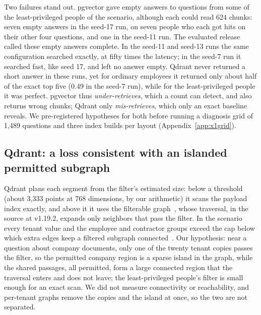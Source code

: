 Two failures stand out. pgvector gave empty answers to questions from some of the least-privileged people of the scenario, although
each could read 624 chunks: seven empty answers in the seed-17 run, on seven people who each got hits on their other four questions, and one in the
seed-11 run. The evaluated release called these empty
answers complete. In the seed-11 and seed-13 runs the same configuration searched exactly, at fifty times the latency; in the seed-7 run it
searched fast, like seed 17, and left no answer empty. Qdrant never
returned a short answer in these runs, yet for ordinary employees it returned only about half of the exact top five (0.49 in the seed-7
run), while for the least-privileged people it was perfect. pgvector thus \emph{under-retrieves}, which a count can detect,
and also returns wrong chunks; Qdrant only \emph{mis-retrieves}, which only an exact baseline reveals. We pre-registered
hypotheses for both before running a diagnosis grid of 1,489 questions and three index builds per layout
(Appendix~\ref{app:x1grid}).

\subsection{Qdrant: a loss consistent with an islanded permitted subgraph}\label{sec:qual-qdrant}

Qdrant plans each segment from the filter's estimated size: below a threshold (about 3,333 points at 768 dimensions, by our arithmetic) it scans the payload index exactly, and above it it uses
the filterable graph~\cite{qdrant2026search}, whose traversal, in the source at v1.19.2, expands only neighbors that pass the filter. In the scenario every tenant value and the employee and contractor groups exceed the cap
below which extra edges keep a filtered subgraph connected~\cite{couzon2026filtered}. Our hypothesis: near a question about company documents,
only one of the twenty tenant copies passes the filter, so the permitted company region is a sparse island in the graph, while
the shared passages, all permitted, form a large connected region that the traversal enters and does not leave; the
least-privileged people's filter is small enough for an exact scan. We did not measure connectivity
or reachability, and per-tenant graphs remove the copies and the island at once, so the two are not separated.

